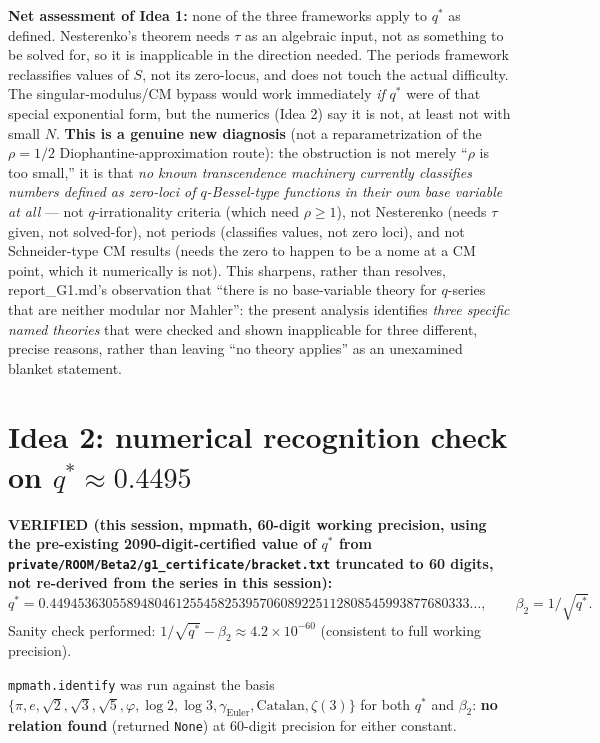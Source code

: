 \documentclass[11pt]{article}
\begin{document}
\textbf{Net assessment of Idea 1:} none of the three frameworks apply to $q^\ast$ as defined.
Nesterenko's theorem needs $\tau$ as an algebraic input, not as something to be solved for, so
it is inapplicable in the direction needed. The periods framework reclassifies values of $S$,
not its zero-locus, and does not touch the actual difficulty. The singular-modulus/CM bypass
would work immediately \emph{if} $q^\ast$ were of that special exponential form, but the
numerics (Idea 2) say it is not, at least not with small $N$. \textbf{This is a genuine new
diagnosis} (not a reparametrization of the $\rho=1/2$ Diophantine-approximation route): the
obstruction is not merely ``$\rho$ is too small,'' it is that \emph{no known transcendence
machinery currently classifies numbers defined as zero-loci of $q$-Bessel-type functions in
their own base variable at all} --- not $q$-irrationality criteria (which need $\rho\ge1$), not
Nesterenko (needs $\tau$ given, not solved-for), not periods (classifies values, not zero
loci), and not Schneider-type CM results (needs the zero to happen to be a nome at a CM point,
which it numerically is not). This sharpens, rather than resolves, report\_G1.md's observation
that ``there is no base-variable theory for $q$-series that are neither modular nor Mahler'': the
present analysis identifies \emph{three specific named theories} that were checked and shown
inapplicable for three different, precise reasons, rather than leaving ``no theory applies'' as
an unexamined blanket statement.

\section{Idea 2: numerical recognition check on $q^\ast\approx0.4495$}

\textbf{VERIFIED (this session, mpmath, 60-digit working precision, using the pre-existing
2090-digit-certified value of $q^\ast$ from \texttt{private/ROOM/Beta2/g1\_certificate/bracket.txt}
truncated to 60 digits, not re-derived from the series in this session):}
\[
q^\ast = 0.449453630558948046125545825395706089225112808545993877680333\ldots,\qquad
\beta_2 = 1/\sqrt{q^\ast}.
\]
Sanity check performed: $1/\sqrt{q^\ast}-\beta_2 \approx 4.2\times10^{-60}$ (consistent to
full working precision).

\texttt{mpmath.identify} was run against the basis
$\{\pi,e,\sqrt2,\sqrt3,\sqrt5,\varphi,\log2,\log3,\gamma_{\mathrm{Euler}},\text{Catalan},\zeta(3)\}$
for both $q^\ast$ and $\beta_2$: \textbf{no relation found} (returned \texttt{None}) at 60-digit
precision for either constant.
\end{document}
